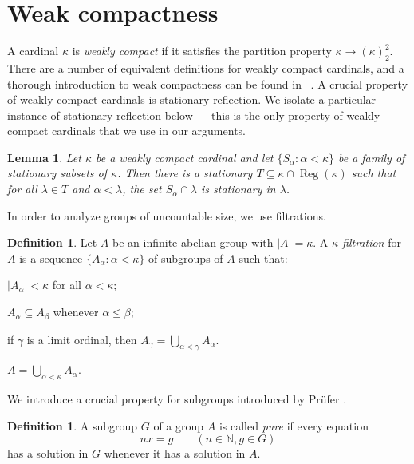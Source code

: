 \documentclass[a4paper]{amsart}
\newenvironment{enumerate-(i)}{\begin{enumerate}[label={\upshape (\roman*)}, leftmargin=2pc]}{\end{enumerate}}
\newtheorem{lemma}[theorem]{Lemma}
\theoremstyle{definition}
\newtheorem{definition}[theorem]{Definition}
\theoremstyle{remark}
\numberwithin{equation}{section}
\DeclareMathOperator{\Reg}{Reg}
\begin{document}
\section{Weak compactness}


A cardinal \(\kappa\) is \emph{weakly compact} if it satisfies the partition property \(\kappa\to (\kappa)^2_2\).
There are a number of equivalent definitions for weakly compact cardinals, and a thorough introduction to weak compactness can be found in ~\cite[Chapter~9]{Jec}.
A crucial property of weakly compact cardinals is stationary reflection. We isolate a particular instance of stationary reflection below --- this is the only property of weakly compact cardinals that we use in our arguments.
\begin{lemma}
    \label{lem:reflection}
        Let \(\kappa\) be a weakly compact cardinal and let \(\{S_\alpha: \alpha<\kappa\}\) be a family of stationary subsets of \(\kappa\). Then there is a stationary \(T\subseteq \kappa \cap \Reg(\kappa)\) such that for all \(\lambda \in T\) and \(\alpha<\lambda\), the set
        \( S_\alpha \cap \lambda\) is stationary in \(\lambda\).
    \end{lemma}

In order to analyze groups of uncountable size, we use filtrations.

\begin{definition}
    Let \(A\) be an infinite abelian group with \(|A| = \kappa\). A \emph{\(\kappa\)-filtration} for \(A\) is a sequence \(\{ A_\alpha : \alpha<\kappa\}\) of subgroups of \(A\) such that:
    \begin{enumerate-(i)}
        \item 
        \(|A_\alpha| <\kappa\) for all \(\alpha<\kappa\);
        \item 
         \(A_\alpha\subseteq A_\beta\) whenever \(\alpha\leq \beta\);
        \item 
        if \(\gamma\) is a limit ordinal, then \(A_\gamma = \bigcup_{\alpha<\gamma}A_\alpha\).
        \item 
        \(A= \bigcup_{\alpha<\kappa}A_\alpha\).
    \end{enumerate-(i)}
\end{definition}


We introduce a crucial property for subgroups introduced by Pr\"ufer \cite{Pru23}.

\begin{definition}
    A subgroup $G$ of a group $A$ is called \emph{pure} if every equation \[nx = g \qquad (n\in\mathbb{N} , g\in G)\] has a solution in \(G\) whenever it has a solution in $A$.
\end{definition}
\end{document}
